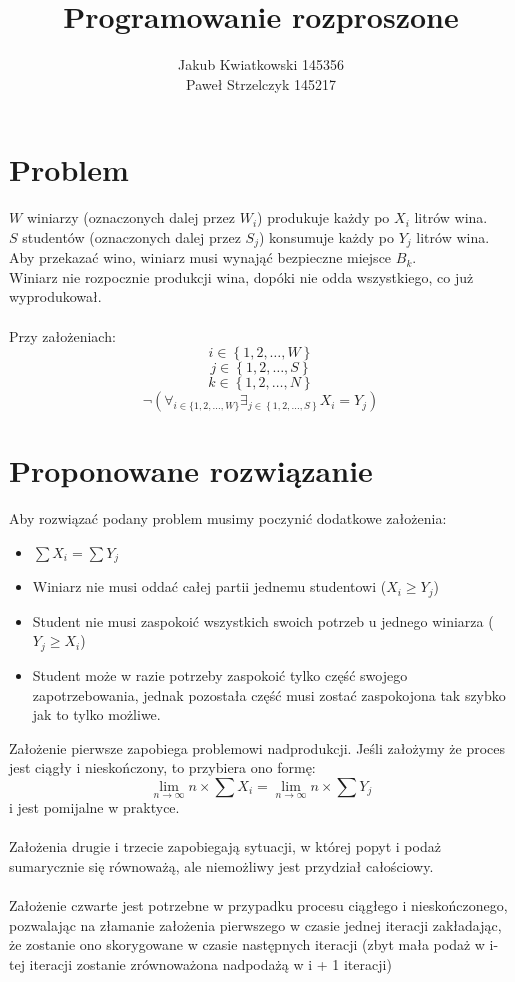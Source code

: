 \documentclass[12pt, a4paper, oneside]{article}
\title{Programowanie rozproszone}
\author{Jakub Kwiatkowski 145356\\Paweł Strzelczyk 145217}
\date{}
\begin{document}
\maketitle

\section*{Problem}
$ W $ winiarzy (oznaczonych dalej przez $ W_{i} $) produkuje każdy po $ X_{i} $ litrów wina.\\
$ S $ studentów (oznaczonych dalej przez $ S_{j} $) konsumuje każdy po $ Y_{j} $ litrów wina.\\
Aby przekazać wino, winiarz musi wynająć bezpieczne miejsce $ B_{k} $.\\
Winiarz nie rozpocznie produkcji wina, dopóki nie odda wszystkiego, co już wyprodukował.\\
\\
Przy założeniach:
$$ i \in \left\{1, 2, \ldots, W\right\} $$
$$ j \in \left\{1, 2, \ldots, S\right\} $$
$$ k \in \left\{1, 2, \ldots, N\right\} $$
$$ \neg (\forall_{i \in \{1, 2, \ldots, W\}} \exists_{j \in \left\{1, 2, \ldots, S\right\}} X_{i} = Y_{j}) $$

\section*{Proponowane rozwiązanie}

Aby rozwiązać podany problem musimy poczynić dodatkowe założenia:

\begin{itemize}
    \item $ \sum X_{i} = \sum Y_{j} $
    \item Winiarz nie musi oddać całej partii jednemu studentowi ($ X_{i} \geq Y_{j} $)
    \item Student nie musi zaspokoić wszystkich swoich potrzeb u jednego winiarza ($ Y_{j} \geq X_{i} $)
    \item Student może w razie potrzeby zaspokoić tylko część swojego zapotrzebowania, jednak pozostała część musi zostać zaspokojona tak szybko jak to tylko możliwe.
\end{itemize}

Założenie pierwsze zapobiega problemowi nadprodukcji. Jeśli założymy że proces jest ciągły i nieskończony, to przybiera ono formę:
\begin{equation*}
    \lim_{n \to \infty}{n \times \sum X_{i}} = \lim_{n \to \infty}{n \times \sum Y_{j}}
\end{equation*}
i jest pomijalne w praktyce.\\
\\
Założenia drugie i trzecie zapobiegają sytuacji, w której popyt i podaż sumarycznie się równoważą, ale niemożliwy jest przydział całościowy.\\
\\
Założenie czwarte jest potrzebne w przypadku procesu ciągłego i nieskończonego, pozwalając na złamanie założenia pierwszego w czasie jednej iteracji
zakładając, że zostanie ono skorygowane w czasie następnych iteracji (zbyt mała podaż w i-tej iteracji zostanie zrównoważona nadpodażą w  i + 1 iteracji)
\end{document}

